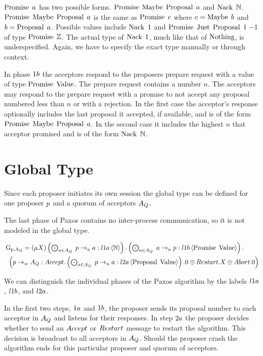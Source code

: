 $\operatorname{Promise}\; a$ has two possible forms.
$\operatorname{Promise}\; \operatorname{Maybe}\; \operatorname{Proposal}\; a$ and $\operatorname{Nack}\; \mathbb{N}$.
$\operatorname{Promise}\; \operatorname{Maybe}\; \operatorname{Proposal}\; a$ is the same as $\operatorname{Promise}\; c$ where $c = \operatorname{Maybe}\; b$ and $b = \operatorname{Proposal}\; a$.
Possible values include $\operatorname{Nack}\; 1$ and $\operatorname{Promise}\; \operatorname{Just}\; \operatorname{Proposal}\; 1\; {-1}$ of type $\operatorname{Promise}\; \mathbb{Z}$.
The actual type of $\operatorname{Nack}\; 1$, much like that of $\operatorname{Nothing}$, is underspecified.
Again, we have to specify the exact type manually or through context.

In phase $1b$ the acceptors respond to the proposers prepare request with a value of type $\operatorname{Promise}\; \operatorname{Value}$.
The prepare request contains a number $n$.
The acceptors may respond to the prepare request with a promise to not accept any proposal numbered less than $n$ or with a rejection.
In the first case the acceptor's response optionally includes the last proposal it accepted, if available, and is of the form $\operatorname{Promise}\; \operatorname{Maybe}\; \operatorname{Proposal}\; a$.
In the second case it includes the highest $n$ that acceptor promised and is of the form $\operatorname{Nack}\; \mathbb{N}$.

\section{Global Type}
Since each proposer initiates its own session the global type can be defined for one proposer $p$ and a quorum of acceptors $A_Q$.

The last phase of Paxos contains no inter-process communication, so it is not modeled in the global type.

\begin{align*}
&\operatorname{G_{p, A_Q}} = \left(\mu X\right)
\textstyle\left(\bigodot_{a \in A_Q}\;p \to_u a : l1a \left\langle \mathbb{N} \right\rangle\right) .
\textstyle\left(\bigodot_{a \in A_Q}\;a \to_u p : l1b \left\langle \operatorname{Promise}\; \operatorname{Value} \right\rangle\right) .\\
&\hspace*{0.5em * 1}\left(p \to_w A_Q : 
\mathnormal{Accept}.\textstyle\left(\bigodot_{a \in A_Q}\;p \to_u a : l2a \left\langle \operatorname{Proposal}\; \operatorname{Value} \right\rangle\right).0 \oplus
\mathnormal{Restart}.X \oplus
\mathnormal{Abort}.0\right)
\end{align*}

We can distinguish the individual phases of the Paxos algorithm by the labels $l1a$, $l1b$, and $l2a$.

In the first two steps, $1a$ and $1b$, the proposer sends its proposal number to each acceptor in $A_Q$ and listens for their responses.
In step $2a$ the proposer decides whether to send an $\mathnormal{Accept}$ or $\mathnormal{Restart}$ message to restart the algorithm.
This decision is broadcast to all acceptors in $A_Q$.
Should the proposer crash the algorithm ends for this particular proposer and quorum of acceptors.

